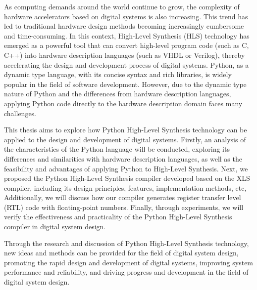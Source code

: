 \begin{enabstract}
As computing demands around the world continue to grow,
the complexity of hardware accelerators based on digital systems is also increasing.
This trend has led to traditional hardware design methods becoming increasingly cumbersome and time-consuming.
In this context, High-Level Synthesis (HLS) technology has emerged as a powerful tool 
that can convert high-level program code (such as C, C++) 
into hardware description languages (such as VHDL or Verilog), 
thereby accelerating the design and development process of digital systems. 
Python, as a dynamic type language, 
with its concise syntax and rich libraries, 
is widely popular in the field of software development. 
However, due to the dynamic type nature of Python 
and the differences from hardware description languages, 
applying Python code directly to the hardware description domain faces many challenges.

This thesis aims to explore how Python High-Level Synthesis technology 
can be applied to the design and development of digital systems. 
Firstly, an analysis of the characteristics of the Python language will be conducted, 
exploring its differences and similarities with hardware description languages, 
as well as the feasibility and advantages of applying Python to High-Level Synthesis. 
Next, we proposed the Python High-Level Synthesis compiler developed 
based on the XLS compiler,
including its design principles, features, implementation methods, etc,
Additionally, we will discuss how our compiler generates register transfer level (RTL) 
code with floating-point numbers.
Finally, through experiments, 
we will verify the effectiveness and practicality of the Python High-Level Synthesis 
compiler in digital system design.

Through the research and discussion of Python High-Level Synthesis technology, 
new ideas and methods can be provided for the field of digital system design, 
promoting the rapid design and development of digital systems, 
improving system performance and reliability, 
and driving progress and development in the field of digital system design.

\end{enabstract}